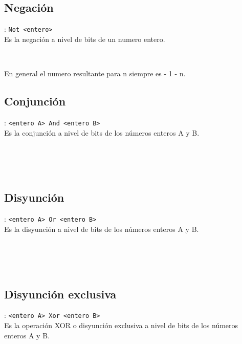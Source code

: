       \subsection*{Negación}: \texttt{Not <entero>}\\
      Es la negación a nivel de bits de un numero entero.
      
      \begin{fxcode}
         \\
      \end{fxcode}
      
      En general el numero resultante para n siempre es - 1 - n.
      
      \subsection*{Conjunción}: \texttt{<entero A>~And <entero B>}\\
      Es la conjunción a nivel de bits de los números enteros A y B.
      
      \begin{fxcode}
         \\
         \\
         \\
      \end{fxcode}
      
      \subsection*{Disyunción}: \texttt{<entero A>~Or <entero B>}\\
      Es la disyunción a nivel de bits de los números enteros A y B.
      
      \begin{fxcode}
         \\
         \\
         \\
      \end{fxcode}
      
      \subsection*{Disyunción exclusiva}: \texttt{<entero A>~Xor <entero B>}\\
      Es la operación XOR o disyunción exclusiva a nivel de bits de los números enteros A y B.
      
